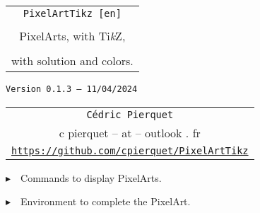 \documentclass{article}
\def\TPversion{0.1.3}
\def\TPdate{11/04/2024}
\begin{document}
\pagestyle{fancy}

\thispagestyle{empty}

\vspace{2cm}

\begin{center}
	\begin{minipage}{0.75\linewidth}
	\begin{tcolorbox}[colframe=yellow,colback=yellow!15]
		\begin{center}
			\begin{tabular}{c}
				{\Huge \texttt{PixelArtTikz [en]}}\\
				\\
				{\LARGE PixelArts, with Ti\textit{k}Z}, \\
				\\
				{\LARGE with solution and colors.} \\
			\end{tabular}
			
			\medskip
			
			{\small \texttt{Version \TPversion{} -- \TPdate}}
		\end{center}
	\end{tcolorbox}
\end{minipage}
\end{center}

\vspace{0.5cm}

\begin{center}
	\begin{tabular}{c}
	\texttt{Cédric Pierquet}\\
	{\ttfamily c pierquet -- at -- outlook . fr}\\
	\texttt{\url{https://github.com/cpierquet/PixelArtTikz}}
\end{tabular}
\end{center}

\vspace{0.25cm}

{$\blacktriangleright$~~Commands to display PixelArts.}

\smallskip

{$\blacktriangleright$~~Environment to complete the PixelArt.}

\smallskip

\vspace{1cm}
\end{document}
